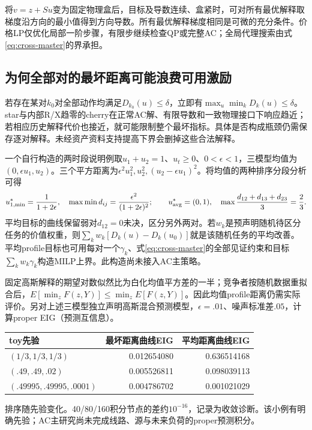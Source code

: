 \documentclass[UTF8,fontset=fandol,11pt,a4paper]{ctexart}
\begin{document}
将$v=z+Su$变为固定物理盒后，目标及导数连续、盒紧时，可对所有最优解释取梯度沿方向的最小值得到方向导数。所有最优解释梯度相同是可微的充分条件。价格LP仅优化局部一阶步骤，有限步继续检查QP或完整AC；全局代理搜索由式\eqref{eq:cross-master}的界承担。

\subsection{为何全部对的最坏距离可能浪费可用激励}
若存在某对$k_0$对全部动作均满足$D_{k_0}(u)\le\delta$，立即有$\max_u\min_kD_k(u)\le\delta$。star与内部R/X趋零的cherry在正常AC解、有限导数和一致物理接口下响应趋近；若相应历史解释代价也接近，就可能限制整个最坏指标。具体是否构成瓶颈仍需保存逐对解释。未经资产资料支持提高下界会删掉这些合法解释。

一个自行构造的两时段说明例取$u_1+u_2=1$、$u_t\ge0$、$0<\epsilon<1$，三模型均值为$(0,\epsilon u_1,u_2)$。三个平方距离为$\epsilon^2u_1^2,u_2^2,(u_2-\epsilon u_1)^2$。将均值的两种排序分段分析可得
\begin{equation}
 u_{1,\min}^*=\frac1{1+2\epsilon},\quad
 \max\min d_{ij}=\frac{\epsilon^2}{(1+2\epsilon)^2};
 \qquad u_{\rm avg}^*=(0,1),\quad
 \max\frac{d_{12}+d_{13}+d_{23}}3=\frac23.
\end{equation}
平均目标的曲线保留弱对$d_{12}=0$未决，区分另外两对。若$w_k$是预声明随机待区分任务的价值权重，则$\sum_kw_k[D_k(u)-D_k(u_0)]$就是该随机任务的平均改善。平均profile目标也可用每对一个$\gamma_k$、式\eqref{eq:cross-master}的全部见证约束和目标$\sum_kw_k\gamma_k$构造MILP上界。此构造尚未接入AC主策略。

固定高斯解释的期望对数似然比为白化均值平方差的一半；竞争者按随机数据重拟合后，$E[\min_z F(z,Y)]\le\min_z E[F(z,Y)]$。因此均值profile距离仍需实际评价。另对上述三模型独立声明高斯混合预测模型，$\epsilon=.01$、噪声标准差$.05$，计算proper EIG（预测互信息）。
\begin{center}\begin{tabular}{lrr}
\toprule toy先验 & 最坏距离曲线EIG & 平均距离曲线EIG\\\midrule
$(1/3,1/3,1/3)$ &0.012654080&0.636514168\\
$(.49,.49,.02)$ &0.005526811&0.098039113\\
$(.49995,.49995,.0001)$ &0.004786702&0.001021029\\\bottomrule
\end{tabular}\end{center}
排序随先验变化。40/80/160积分节点的差约$10^{-16}$，记录为收敛诊断。该小例有明确先验；AC主研究尚未完成线路、源与未来负荷的proper预测积分。
\end{document}
